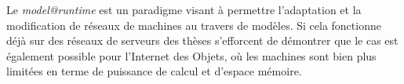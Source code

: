 \pagestyle{empty}

\vspace*{\fill}
\begin{center}

Le \emph{model@runtime} est un paradigme visant à permettre l'adaptation et la modification de réseaux de machines au travers de modèles. Si cela fonctionne déjà sur des réseaux de serveurs des thèses s'efforcent de démontrer que le cas est également possible pour l'Internet des Objets, où les machines sont bien plus limitées en terme de puissance de calcul et d'espace mémoire.

\end{center}
\vspace*{\fill}
